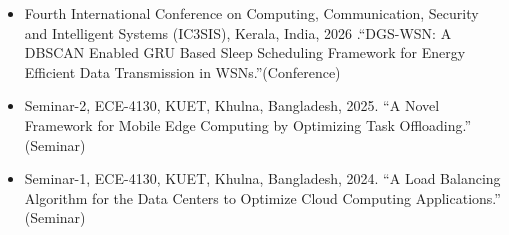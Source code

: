 \begin{itemize}
    \item Fourth International Conference on Computing, Communication, Security and Intelligent Systems (IC3SIS), Kerala, India, 2026 .\enquote{DGS-WSN: A DBSCAN Enabled GRU Based Sleep Scheduling Framework for Energy Efficient Data Transmission in WSNs.}(Conference)

    \item Seminar-2, ECE-4130, KUET, Khulna, Bangladesh, 2025. \enquote{A Novel Framework for Mobile Edge Computing by Optimizing Task Offloading.} (Seminar)

    \item Seminar-1, ECE-4130, KUET, Khulna, Bangladesh, 2024. \enquote{A Load Balancing Algorithm for the Data Centers to Optimize Cloud Computing Applications.} (Seminar)
\end{itemize}